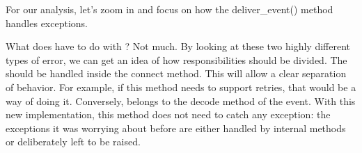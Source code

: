 \documentclass[a4paper,10pt,english]{sphinxmanual}
\begin{document}
\begin{sphinxVerbatim}[commandchars=\\\{\}]
     
           
                  
               
                 

         

      
             
\end{sphinxVerbatim}

For our analysis, let’s zoom in and focus on how the deliver\_event() method handles exceptions.

What does  have to do with ? Not much. By looking at these two highly
different types of error, we can get an idea of how responsibilities should be divided. The
 should be handled inside the connect method. This will allow a clear separation of
behavior. For example, if this method needs to support retries, that would be a way of doing it. Conversely,
 belongs to the decode method of the event. With this new implementation, this method does not
need to catch any exception: the exceptions it was worrying about before are either handled by internal
methods or deliberately left to be raised.
\end{document}
